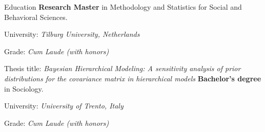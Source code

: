 \begin{rubric}{Education}
\entry*[2017 -- 2019]%
	\textbf{Research Master} in Methodology and Statistics for Social and Behavioral Sciences.
	\par University: \emph{Tilburg University, Netherlands}
	\par Grade: \emph{Cum Laude (with honors)}
	\par Thesis title: \emph{Bayesian Hierarchical Modeling: A sensitivity analysis of prior distributions for the covariance matrix in hierarchical models}
\entry*[2014 -- 2017]%
	\textbf{Bachelor's degree} in Sociology.
	\par University: \emph{University of Trento, Italy}
	\par Grade: \emph{Cum Laude (with honors)}
\end{rubric}